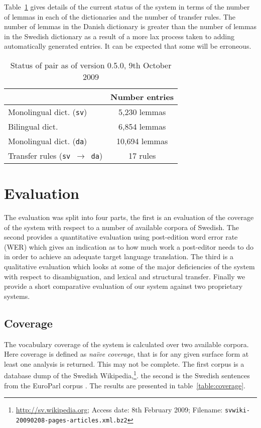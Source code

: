\documentclass[11pt]{article}
\begin{document}
Table~\ref{table:status} gives details of the current status of the system
in terms of the number of lemmas in each of the dictionaries and the number 
of transfer rules. The number of lemmas in the Danish dictionary is greater 
than the number of lemmas in the Swedish dictionary as a result of a more 
lax process taken to adding automatically generated entries. It can be 
expected that some will be erroneous.

\begin{table}
\centering
\begin{tabular}{|l|c|}
\hline
                                           & Number entries\\
\hline
Monolingual dict. ({\tt sv})               & 5,230 lemmas \\
Bilingual dict.                            & 6,854 lemmas \\
Monolingual dict. ({\tt da})               & 10,694 lemmas \\
Transfer rules ({\tt sv $\rightarrow$ da}) & 17 rules \\
\hline
\end{tabular}
    \caption{Status of pair as of version 0.5.0, 9th October 2009}
    \label{table:status}
\end{table}


\section{Evaluation}

The evaluation was split into four parts, the first is an evaluation of the coverage
of the system with respect to a number of available corpora of Swedish. The second
provides a quantitative evaluation using post-edition word error rate (WER) which 
gives an indication as to how much work a post-editor needs to do in order to 
achieve an adequate target language translation. The third is a qualitative evaluation
which looks at some of the major deficiencies of the system with respect to disambiguation,
and lexical and structural transfer. Finally we provide a short comparative evaluation of
our system against two proprietary systems.

\subsection{Coverage}

The vocabulary coverage of the system is calculated over two available corpora. Here coverage
is defined as \emph{na\"ive coverage}, that is for any given surface form at least one analysis
is returned. This may not be complete. The first corpus is a database dump of the Swedish 
Wikipedia,\footnote{\url{http://sv.wikipedia.org}; Access date: 8th February 2009; Filename: 
{\small\tt svwiki-20090208-pages-articles.xml.bz2}}. the second is the Swedish sentences 
from the EuroParl corpus \cite{Koehn2005}. The results are presented in table~\ref{table:coverage}.
\end{document}
